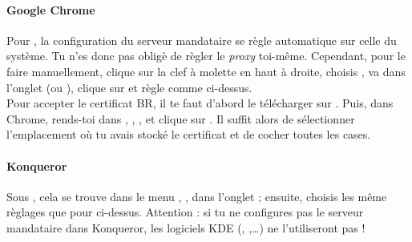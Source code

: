 


\paragraph{Google Chrome}

Pour , la configuration du serveur mandataire se règle automatique sur celle du système. Tu n'es donc pas obligè de règler le \emph{proxy} toi-même. Cependant, pour le faire manuellement, clique sur la
clef à molette en haut à droite, choisis , va dans l'onglet  (ou ), clique sur  et règle comme ci-dessus.\\

Pour accepter le certificat BR, il te faut d'abord le télécharger sur .
Puis, dans Chrome, rends-toi dans , , ,
 et clique sur . Il suffit alors de sélectionner l'emplacement où tu avais stocké le certificat et de cocher toutes les cases.

\paragraph{Konqueror}

Sous , cela se trouve dans le menu , ,
dans l'onglet  ; ensuite, choisis les même règlages que pour  ci-dessus.
Attention : si tu ne configures pas le serveur mandataire dans Konqueror,
les logiciels KDE (, ,\dots) ne l'utiliseront pas !




